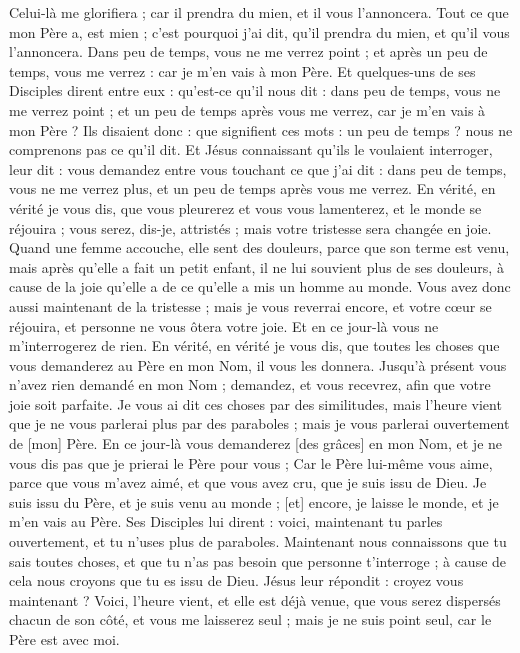\begin{multicols}{2}
Celui-là me glorifiera ; car il prendra du mien, et il vous l'annoncera.
Tout ce que mon Père a, est mien ; c'est pourquoi j'ai dit, qu'il prendra du mien, et qu'il vous l'annoncera.
Dans peu de temps, vous ne me verrez point ; et après un peu de temps, vous me verrez : car je m'en vais à mon Père.
Et quelques-uns de ses Disciples dirent entre eux : qu'est-ce qu'il nous dit : dans peu de temps, vous ne me verrez point ; et un peu de temps après vous me verrez, car je m'en vais à mon Père ?
Ils disaient donc : que signifient ces mots : un peu de temps ? nous ne comprenons pas ce qu'il dit.
Et Jésus connaissant qu'ils le voulaient interroger, leur dit : vous demandez entre vous touchant ce que j'ai dit : dans peu de temps, vous ne me verrez plus, et un peu de temps après vous me verrez.
En vérité, en vérité je vous dis, que vous pleurerez et vous vous lamenterez, et le monde se réjouira ; vous serez, dis-je, attristés ; mais votre tristesse sera changée en joie.
Quand une femme accouche, elle sent des douleurs, parce que son terme est venu, mais après qu'elle a fait un petit enfant, il ne lui souvient plus de ses douleurs, à cause de la joie qu'elle a de ce qu'elle a mis un homme au monde.
Vous avez donc aussi maintenant de la tristesse ; mais je vous reverrai encore, et votre cœur se réjouira, et personne ne vous ôtera votre joie.
Et en ce jour-là vous ne m'interrogerez de rien. En vérité, en vérité je vous dis, que toutes les choses que vous demanderez au Père en mon Nom, il vous les donnera.
Jusqu'à présent vous n'avez rien demandé en mon Nom ; demandez, et vous recevrez, afin que votre joie soit parfaite.
Je vous ai dit ces choses par des similitudes, mais l'heure vient que je ne vous parlerai plus par des paraboles ; mais je vous parlerai ouvertement de [mon] Père.
En ce jour-là vous demanderez [des grâces] en mon Nom, et je ne vous dis pas que je prierai le Père pour vous ;
Car le Père lui-même vous aime, parce que vous m'avez aimé, et que vous avez cru, que je suis issu de Dieu.
Je suis issu du Père, et je suis venu au monde ; [et] encore, je laisse le monde, et je m'en vais au Père.
Ses Disciples lui dirent : voici, maintenant tu parles ouvertement, et tu n'uses plus de paraboles.
Maintenant nous connaissons que tu sais toutes choses, et que tu n'as pas besoin que personne t'interroge ; à cause de cela nous croyons que tu es issu de Dieu.
Jésus leur répondit : croyez vous maintenant ?
Voici, l'heure vient, et elle est déjà venue, que vous serez dispersés chacun de son côté, et vous me laisserez seul ; mais je ne suis point seul, car le Père est avec moi.

\end{multicols}
